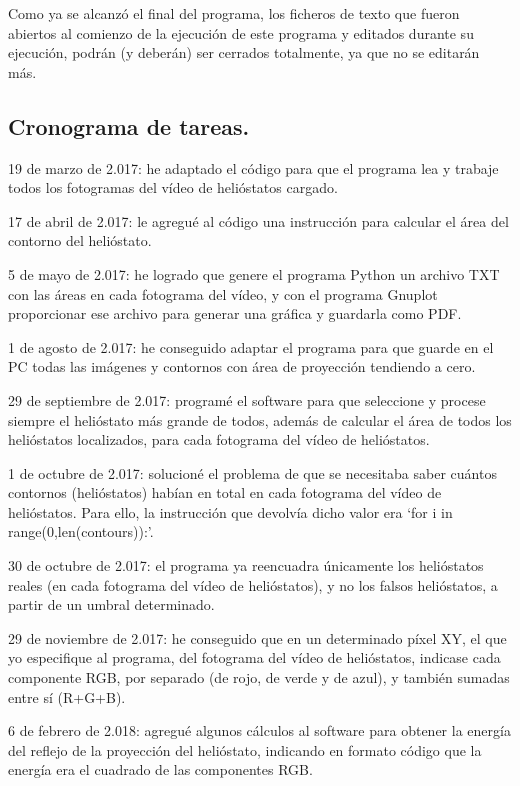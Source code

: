 Como ya se alcanzó el final del programa, los ficheros de texto que fueron abiertos al comienzo de la ejecución de este programa y editados durante su ejecución, podrán (y deberán) ser cerrados totalmente, ya que no se editarán más.



\subsection{Cronograma de tareas.}



19 de marzo de 2.017: he adaptado el código para que el programa lea y trabaje todos los fotogramas del vídeo de helióstatos cargado.

17 de abril de 2.017: le agregué al código una instrucción para calcular el área del contorno del helióstato.

5 de mayo de 2.017: he logrado que genere el programa Python un archivo TXT con las áreas en cada fotograma del vídeo, y con el programa Gnuplot proporcionar ese archivo para generar una gráfica y guardarla como PDF.

1 de agosto de 2.017: he conseguido adaptar el programa para que guarde en el PC todas las imágenes y contornos con área de proyección tendiendo a cero.

29 de septiembre de 2.017: programé el software para que seleccione y procese siempre el helióstato más grande de todos, además de calcular el área de todos los helióstatos localizados, para cada fotograma del vídeo de helióstatos.

1 de octubre de 2.017: solucioné el problema de que se necesitaba saber cuántos contornos (helióstatos) habían en total en cada fotograma del vídeo de helióstatos. Para ello, la instrucción que devolvía dicho valor era ‘for i in range(0,len(contours)):’.

30 de octubre de 2.017: el programa ya reencuadra únicamente los helióstatos reales (en cada fotograma del vídeo de helióstatos), y no los falsos helióstatos, a partir de un umbral determinado.

29 de noviembre de 2.017: he conseguido que en un determinado píxel XY, el que yo especifique al programa, del fotograma del vídeo de helióstatos, indicase cada componente RGB, por separado (de rojo, de verde y de azul), y también sumadas entre sí (R+G+B).

6 de febrero de 2.018: agregué algunos cálculos al software para obtener la energía del reflejo de la proyección del helióstato, indicando en formato código que la energía era el cuadrado de las componentes RGB.

